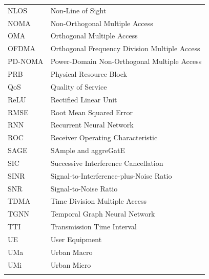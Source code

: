 \begin{longtable}{p{3cm} p{11cm}}
NLOS & Non-Line of Sight \\
NOMA & Non-Orthogonal Multiple Access \\
OMA & Orthogonal Multiple Access \\
OFDMA & Orthogonal Frequency Division Multiple Access \\
PD-NOMA & Power-Domain Non-Orthogonal Multiple Access \\
PRB & Physical Resource Block \\
QoS & Quality of Service \\
ReLU & Rectified Linear Unit \\
RMSE & Root Mean Squared Error \\
RNN & Recurrent Neural Network \\
ROC & Receiver Operating Characteristic \\
SAGE & SAmple and aggreGatE \\
SIC & Successive Interference Cancellation \\
SINR & Signal-to-Interference-plus-Noise Ratio \\
SNR & Signal-to-Noise Ratio \\
TDMA & Time Division Multiple Access \\
TGNN & Temporal Graph Neural Network \\
TTI & Transmission Time Interval \\
UE & User Equipment \\
UMa & Urban Macro \\
UMi & Urban Micro \\
\\
\bottomrule
\end{longtable}

\newpage
